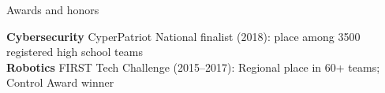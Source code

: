 	\begin{rSection}{Awards and honors} 

		{\bf Cybersecurity} CyperPatriot National finalist (2018):  place among 3500 registered high school teams\\
		{\bf Robotics} FIRST Tech Challenge (2015--2017): Regional  place in 60+ teams; Control Award winner
		
	\end{rSection}




